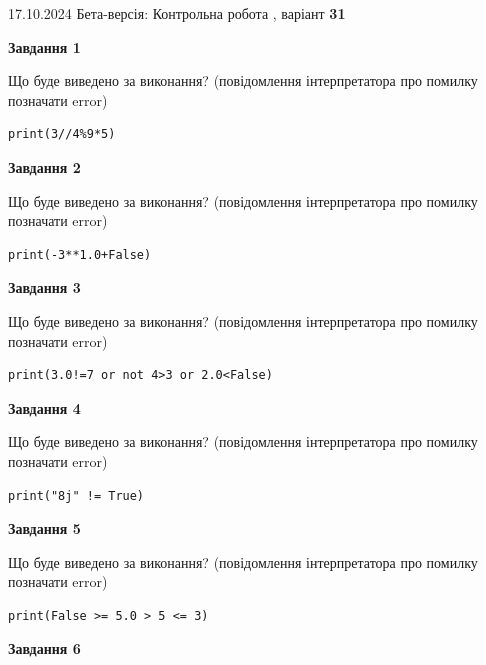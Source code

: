 \documentclass[12pt, ukrainian]{article}
\begin{document}
{\Large{17.10.2024 Бета-версія: Контрольна робота , варіант  \No \textbf { 31 }\par}}
{
\begin {large}
{\begin {center}\textbf{Завдання 1}\end {center}}

Що буде виведено за виконання? (повідомлення інтерпретатора про помилку позначати error)\par
\begin{verbatim}
print(3//4%9*5)
\end{verbatim}

{\begin {center}\textbf{Завдання 2}\end {center}}

Що буде виведено за виконання? (повідомлення інтерпретатора про помилку позначати error)\par
\begin{verbatim}
print(-3**1.0+False)
\end{verbatim}

{\begin {center}\textbf{Завдання 3}\end {center}}

Що буде виведено за виконання? (повідомлення інтерпретатора про помилку позначати error)\par
\begin{verbatim}
print(3.0!=7 or not 4>3 or 2.0<False)
\end{verbatim}

{\begin {center}\textbf{Завдання 4}\end {center}}

Що буде виведено за виконання? (повідомлення інтерпретатора про помилку позначати error)\par
\begin{verbatim}
print("8j" != True)
\end{verbatim}

{\begin {center}\textbf{Завдання 5}\end {center}}

Що буде виведено за виконання? (повідомлення інтерпретатора про помилку позначати error)\par
\begin{verbatim}
print(False >= 5.0 > 5 <= 3)
\end{verbatim}

{\begin {center}\textbf{Завдання 6}\end {center}}


\end{large}}
\end{document}
